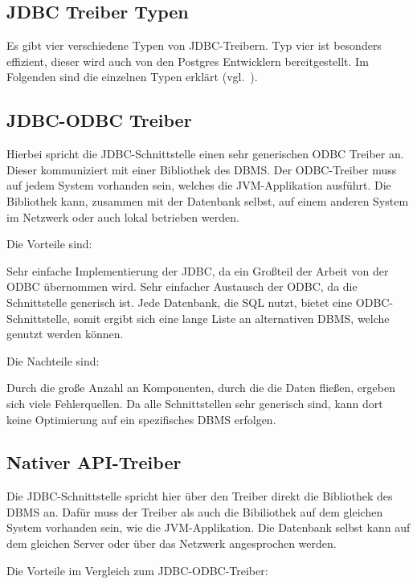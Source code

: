 {\subsection{JDBC Treiber Typen}
Es gibt vier verschiedene Typen von JDBC\hyp{}Treibern. Typ vier ist besonders
effizient, dieser wird auch von den Postgres Entwicklern bereitgestellt. Im
Folgenden sind die einzelnen Typen erklärt (vgl.~\cite{jdbc-types}).

\subsection{JDBC-ODBC Treiber}
Hierbei spricht die JDBC\hyp{}Schnittstelle einen sehr generischen \gls{ODBC}
Treiber an. Dieser kommuniziert mit einer Bibliothek des DBMS\@. Der
ODBC\hyp{}Treiber muss auf jedem System vorhanden sein, welches die
JVM\hyp{}Applikation ausführt. Die Bibliothek kann, zusammen mit der Datenbank
selbst, auf einem anderen System im Netzwerk oder auch lokal betrieben werden.

Die Vorteile sind:

\begin{outline}
  \1 Sehr einfache Implementierung der JDBC, da ein Großteil der Arbeit von
  der ODBC übernommen wird.
  \1 Sehr einfacher Austausch der ODBC, da die Schnittstelle generisch ist.
  \1 Jede Datenbank, die SQL nutzt, bietet eine ODBC\hyp{}Schnittstelle, somit
  ergibt sich eine lange Liste an alternativen DBMS, welche genutzt werden
  können.
\end{outline}

Die Nachteile sind:

\begin{outline}
  \1 Durch die große Anzahl an Komponenten, durch die die Daten fließen,
  ergeben sich viele Fehlerquellen.
  \1 Da alle Schnittstellen sehr generisch sind, kann dort keine Optimierung
  auf ein spezifisches DBMS erfolgen.
\end{outline}

\subsection{Nativer API-Treiber}
Die JDBC\hyp{}Schnittstelle spricht hier über den Treiber direkt die Bibliothek
des DBMS an. Dafür muss der Treiber als auch die Bibiliothek auf dem gleichen
System vorhanden sein, wie die JVM\hyp{}Applikation. Die Datenbank selbst kann
auf dem gleichen Server oder über das Netzwerk angesprochen werden.

Die Vorteile im Vergleich zum JDBC\hyp{}ODBC\hyp{}Treiber:

}
